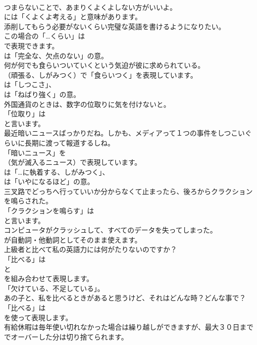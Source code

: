 \documentclass[8pt]{extreport}
\begin{document}
\begin{CJK}{UTF8}{min}
\\	つまらないことで、あまりくよくよしない方がいいよ。 
\\	には「くよくよ考える」と意味があります。	
\\	添削してもらう必要がないくらい完璧な英語を書けるようになりたい。 
\\	この場合の「…くらい」は 
\\	で表現できます。
\\	は「完全な、欠点のない」の意。	
\\	何が何でも食らいついていくという気迫が彼に求められている｡ 
\\	（頑張る、しがみつく）で「食らいつく」を表現しています。
\\	は「しつこさ」、
\\	は「ねばり強く」の意。	
\\	外国通貨のときは、数字の位取りに気を付けないと。 
\\	「位取り」は
\\	と言います。	
\\	最近暗いニュースばっかりだね。しかも、メディアって１つの事件をしつこいぐらいに長期に渡って報道するしね。 
\\	「暗いニュース」を 
\\	（気が滅入るニュース）で表現しています。
\\	は「…に執着する、しがみつく」、
\\	は「いやになるほど」の意。	
\\	三叉路でどっちへ行っていいか分からなくて止まったら、後ろからクラクションを鳴らされた。 
\\	「クラクションを鳴らす」は
\\	と言います。	
\\	コンピュータがクラッシュして、すべてのデータを失ってしまった。 
\\	が自動詞・他動詞としてそのまま使えます。	
\\	上級者と比べて私の英語力には何がたりないのですか？ 
\\	「比べる」は
\\	と
\\	を組み合わせて表現します。
\\	「欠けている、不足している」。	
\\	あの子と、私を比べるときがあると思うけど、それはどんな時？どんな事で？ 
\\	「比べる」は
\\	を使って表現します。	
\\	有給休暇は毎年使い切れなかった場合は繰り越しができますが、最大３０日まででオーバーした分は切り捨てられます。 

\end{CJK}
\end{document}
